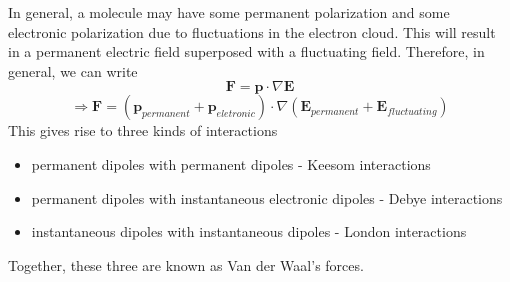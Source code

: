 \documentclass[11pt, letterpaper]{article}
\begin{document}
In general, a molecule may have some permanent polarization and some electronic polarization due to fluctuations in the electron cloud. This will result in a permanent electric field superposed with a fluctuating field. Therefore, in general, we can write
$$
\bm{F} = \bm{p}\cdot \nabla\bm{E}
$$
$$
\Rightarrow \bm{F} = (\bm{p}_{permanent}+\bm{p}_{eletronic})\cdot \nabla(\bm{E}_{permanent}+\bm{E}_{fluctuating})
$$
This gives rise to three kinds of interactions
\begin{itemize}
\item permanent dipoles with permanent dipoles - Keesom interactions 
\item permanent dipoles with instantaneous electronic dipoles - Debye interactions 
\item instantaneous dipoles with instantaneous dipoles - London interactions 
\end{itemize}

Together, these three are known as Van der Waal's forces.
\end{document}
